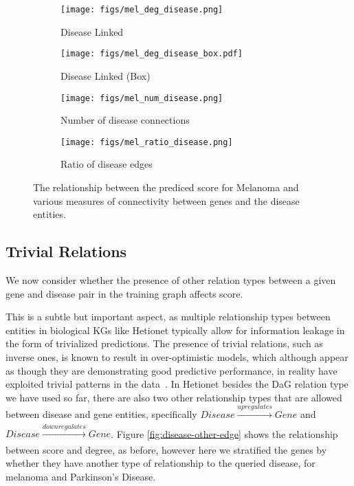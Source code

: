 \begin{figure*}[!ht]
	\centering
	\begin{subfigure}[b]{0.4\textwidth}
		\centering
		\texttt{[image: figs/mel\_deg\_disease.png]}
		\caption{Disease Linked}\label{fig:disease:deg}
	\end{subfigure}
	\begin{subfigure}[b]{0.4\textwidth}
		\centering
		\texttt{[image: figs/mel\_deg\_disease\_box.pdf]}
		\caption{Disease Linked (Box)}\label{fig:disease:deg-box}
	\end{subfigure}

	\begin{subfigure}[b]{0.4\textwidth}
		\centering
		\texttt{[image: figs/mel\_num\_disease.png]}
		\caption{Number of disease connections}\label{fig:disease:num}
	\end{subfigure}
	\begin{subfigure}[b]{0.4\textwidth}
		\centering
		\texttt{[image: figs/mel\_ratio\_disease.png]}
		\caption{Ratio of disease edges}\label{fig:disease:ratio}
	\end{subfigure}
	\caption{The relationship between the prediced score for Melanoma and various measures of connectivity between genes and the disease entities.}
	\label{fig:disease-connections}
\end{figure*}

\subsection{Trivial Relations}\label{ssec:trivial-relations}

We now consider whether the presence of other relation types between a given gene and disease pair in the training graph affects score.

This is a subtle but important aspect, as multiple relationship types between entities in biological KGs like Hetionet typically allow for information leakage in the form of trivialized predictions. The presence of trivial relations, such as inverse ones, is known to result in over-optimistic models, which although appear as though they are demonstrating good predictive performance, in reality have exploited trivial patterns in the data~\cite{toutanova2015observed, dettmers2018convolutional}. In Hetionet besides the DaG relation type we have used so far, there are also two other relationship types that are allowed between disease and gene entities, specifically \(\mathit{Disease} \xrightarrow[]{\textit{upregulates}} \mathit{Gene}\) and \(\mathit{Disease} \xrightarrow[]{\textit{downregulates}} \mathit{Gene}\). Figure \ref{fig:disease-other-edge} shows the relationship between score and degree, as before, however here we stratified the genes by whether they have another type of relationship to the queried disease, for melanoma and Parkinson's Disease.

